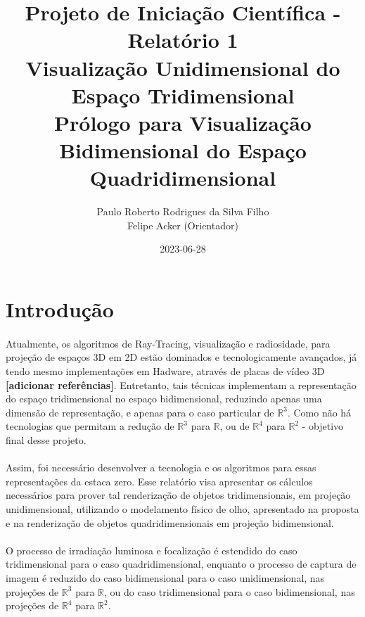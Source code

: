 \documentclass{article}
\title{
	Projeto de Iniciação Científica - Relatório 1\\
	Visualização Unidimensional do Espaço Tridimensional \\
	\large Prólogo para Visualização Bidimensional do Espaço Quadridimensional
}
\date{2023-06-28}
\author{Paulo Roberto Rodrigues da Silva Filho\\ \small Felipe Acker (Orientador)}
\newcommand\R{\mathbb{R}}
\begin{document}
	\renewcommand{\figurename}{Figura}
	\graphicspath{ {./imagens/} }
	\maketitle
	\tableofcontents
	
	\section{Introdução}
	
	\paragraph{}
	Atualmente, os algoritmos de Ray-Tracing, visualização e radiosidade, para projeção de espaços 3D em 2D estão dominados e tecnologicamente avançados, já tendo mesmo implementações em Hadware, através de placas de vídeo 3D \textbf{[adicionar referências]}. Entretanto, tais técnicas implementam a representação do espaço tridimensional no espaço bidimensional, reduzindo apenas uma dimensão de representação, e apenas para o caso particular de $\R^3$. Como não há tecnologias que permitam a redução de $\R^3$ para $\R$, ou de $\R^4$ para $\R^2$ - objetivo final desse projeto.
	
	\paragraph{}
	Assim, foi necessário desenvolver a tecnologia e os algoritmos para essas representações da estaca zero. Esse relatório visa apresentar os cálculos necessários para prover tal renderização de objetos tridimensionais, em projeção unidimensional, utilizando o modelamento físico de olho, apresentado na proposta e na renderização de objetos quadridimensionais em projeção bidimensional.
	
	\paragraph{}
	O processo de irradiação luminosa e focalização é estendido do caso tridimensional para o caso quadridimensional, enquanto o processo de captura de imagem é reduzido do caso bidimensional para o caso unidimensional, nas projeções de $\R^3$ para $\R$, ou do caso tridimensional para o caso bidimensional, nas projeções de $\R^4$ para $\R^2$.
	
	
\end{document}

